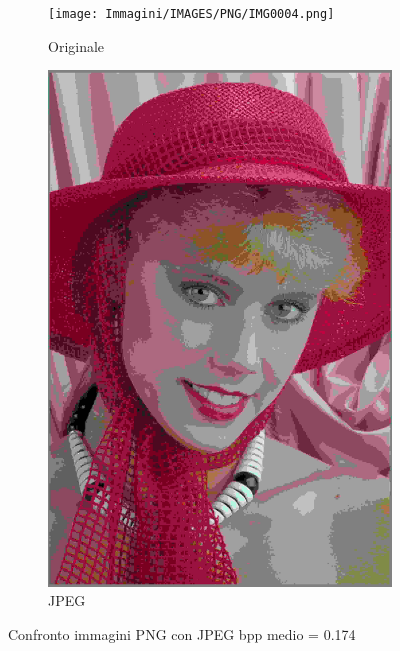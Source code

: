 \newpage
\begin{figure}
    \centering
    \begin{subfigure}[t]{0.3\textwidth}
        \texttt{[image: Immagini/IMAGES/PNG/IMG0004.png]}
        \caption{Originale}
        \label{fig:OriginalJPEG}
    \end{subfigure}
    \hspace*{1.5cm}
    \begin{subfigure}[t]{0.3\textwidth}
        \includegraphics[width=\textwidth]{Immagini/IMAGES/JPEG/IMG0004.png}
        \caption{JPEG}
        \label{fig:CompressedJPEG}
    \end{subfigure}
    \caption{Confronto immagini PNG con JPEG bpp medio = 0.174}
    \label{fig:CompressionJPEG}
\end{figure}

